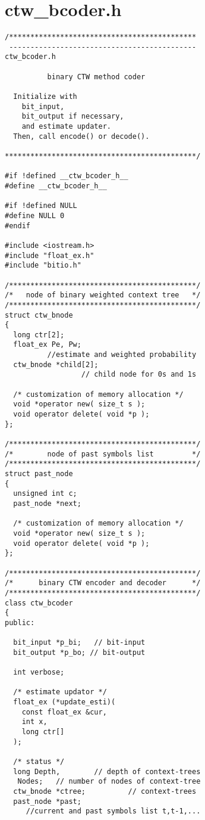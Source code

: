 \section{ctw\_bcoder.h}
\begin{verbatim}
/********************************************
 --------------------------------------------
ctw_bcoder.h

          binary CTW method coder

  Initialize with
    bit_input,
    bit_output if necessary,
    and estimate updater.
  Then, call encode() or decode().

*********************************************/

#if !defined __ctw_bcoder_h__
#define __ctw_bcoder_h__

#if !defined NULL
#define NULL 0
#endif

#include <iostream.h>
#include "float_ex.h"
#include "bitio.h"

/********************************************/
/*   node of binary weighted context tree   */
/********************************************/
struct ctw_bnode
{
  long ctr[2];
  float_ex Pe, Pw;
          //estimate and weighted probability
  ctw_bnode *child[2];
                  // child node for 0s and 1s

  /* customization of memory allocation */
  void *operator new( size_t s );
  void operator delete( void *p );
};

/********************************************/
/*        node of past symbols list         */
/********************************************/
struct past_node
{
  unsigned int c;
  past_node *next;

  /* customization of memory allocation */
  void *operator new( size_t s );
  void operator delete( void *p );
};

/********************************************/
/*      binary CTW encoder and decoder      */
/********************************************/
class ctw_bcoder
{
public:

  bit_input *p_bi;   // bit-input
  bit_output *p_bo; // bit-output

  int verbose;

  /* estimate updator */
  float_ex (*update_esti)(
    const float_ex &cur,
    int x,
    long ctr[]
  );

  /* status */
  long Depth,        // depth of context-trees
   Nodes;   // number of nodes of context-tree
  ctw_bnode *ctree;          // context-trees
  past_node *past;
     //current and past symbols list t,t-1,...


\end{verbatim}
